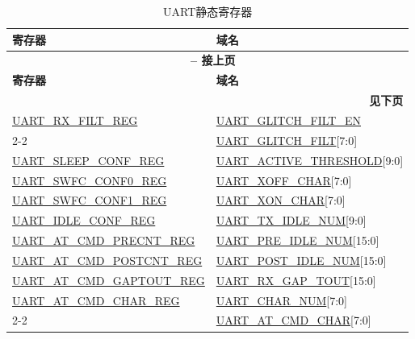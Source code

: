 \documentclass[main\_\_CN.tex]{subfiles}
\begin{document}
\begin{longtable}[c]{|m{6cm}|m{6cm}|}
\caption{UART静态寄存器}
\label{tab:uart-static-reg} \\
    \hline
    \rowcolor{lightgray}
    \textbf{寄存器} & \textbf{域名} \\\hline
    \endfirsthead

    \multicolumn{2}{c}{\bfseries \tablename\ \thetable{} -- 接上页}\\\hline
    \rowcolor{lightgray}
    \textbf{寄存器} & \textbf{域名} \\\hline
    \endhead

    \multicolumn{2}{r}{\textbf{见下页}} \\
    \endfoot
    \endlastfoot

\hyperref[regdesc:UARTRXFILTREG]{UART\_RX\_FILT\_REG} & \hyperref[fielddesc:UARTGLITCHFILTEN]{UART\_GLITCH\_FILT\_EN} \\\cline{2-2}
 & \hyperref[fielddesc:UARTGLITCHFILT]{UART\_GLITCH\_FILT}[7:0] \\\hline
\hyperref[regdesc:UARTSLEEPCONFREG]{UART\_SLEEP\_CONF\_REG} & \hyperref[fielddesc:UARTACTIVETHRESHOLD]{UART\_ACTIVE\_THRESHOLD}[9:0] \\\hline
\hyperref[regdesc:UARTSWFCCONF0REG]{UART\_SWFC\_CONF0\_REG} & \hyperref[fielddesc:UARTXOFFCHAR]{UART\_XOFF\_CHAR}[7:0] \\\hline
\hyperref[regdesc:UARTSWFCCONF1REG]{UART\_SWFC\_CONF1\_REG} & \hyperref[fielddesc:UARTXONCHAR]{UART\_XON\_CHAR}[7:0] \\\hline
\hyperref[regdesc:UARTIDLECONFREG]{UART\_IDLE\_CONF\_REG} & \hyperref[fielddesc:UARTTXIDLENUM]{UART\_TX\_IDLE\_NUM}[9:0] \\\hline
\hyperref[regdesc:UARTATCMDPRECNTREG]{UART\_AT\_CMD\_PRECNT\_REG} & \hyperref[fielddesc:UARTPREIDLENUM]{UART\_PRE\_IDLE\_NUM}[15:0] \\\hline
\hyperref[regdesc:UARTATCMDPOSTCNTREG]{UART\_AT\_CMD\_POSTCNT\_REG} & \hyperref[fielddesc:UARTPOSTIDLENUM]{UART\_POST\_IDLE\_NUM}[15:0] \\\hline
\hyperref[regdesc:UARTATCMDGAPTOUTREG]{UART\_AT\_CMD\_GAPTOUT\_REG} & \hyperref[fielddesc:UARTRXGAPTOUT]{UART\_RX\_GAP\_TOUT}[15:0] \\\hline
\hyperref[regdesc:UARTATCMDCHARREG]{UART\_AT\_CMD\_CHAR\_REG} & \hyperref[fielddesc:UARTCHARNUM]{UART\_CHAR\_NUM}[7:0] \\\cline{2-2}
 & \hyperref[fielddesc:UARTATCMDCHAR]{UART\_AT\_CMD\_CHAR}[7:0] \\\hline
\end{longtable}
\end{document}
